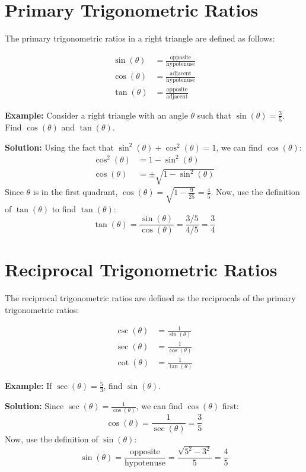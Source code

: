\documentclass{article}
\begin{document}
\section{Primary Trigonometric Ratios}

The primary trigonometric ratios in a right triangle are defined as follows:

\begin{align*}
\sin(\theta) &= \frac{\text{opposite}}{\text{hypotenuse}} \\
\cos(\theta) &= \frac{\text{adjacent}}{\text{hypotenuse}} \\
\tan(\theta) &= \frac{\text{opposite}}{\text{adjacent}}
\end{align*}

\textbf{Example:} Consider a right triangle with an angle $\theta$ such that $\sin(\theta) = \frac{3}{5}$. Find $\cos(\theta)$ and $\tan(\theta)$.

\textbf{Solution:}
Using the fact that $\sin^2(\theta) + \cos^2(\theta) = 1$, we can find $\cos(\theta)$:
\begin{align*}
\cos^2(\theta) &= 1 - \sin^2(\theta) \\
\cos(\theta) &= \pm \sqrt{1 - \sin^2(\theta)}
\end{align*}
Since $\theta$ is in the first quadrant, $\cos(\theta) = \sqrt{1 - \frac{9}{25}} = \frac{4}{5}$.
Now, use the definition of $\tan(\theta)$ to find $\tan(\theta)$:
\[\tan(\theta) = \frac{\sin(\theta)}{\cos(\theta)} = \frac{3/5}{4/5} = \frac{3}{4}\]

\section{Reciprocal Trigonometric Ratios}

The reciprocal trigonometric ratios are defined as the reciprocals of the primary trigonometric ratios:

\begin{align*}
\csc(\theta) &= \frac{1}{\sin(\theta)} \\
\sec(\theta) &= \frac{1}{\cos(\theta)} \\
\cot(\theta) &= \frac{1}{\tan(\theta)}
\end{align*}

\textbf{Example:} If $\sec(\theta) = \frac{5}{3}$, find $\sin(\theta)$.

\textbf{Solution:}
Since $\sec(\theta) = \frac{1}{\cos(\theta)}$, we can find $\cos(\theta)$ first:
\[\cos(\theta) = \frac{1}{\sec(\theta)} = \frac{3}{5}\]
Now, use the definition of $\sin(\theta)$:
\[\sin(\theta) = \frac{\text{opposite}}{\text{hypotenuse}} = \frac{\sqrt{5^2 - 3^2}}{5} = \frac{4}{5}\]
\end{document}
